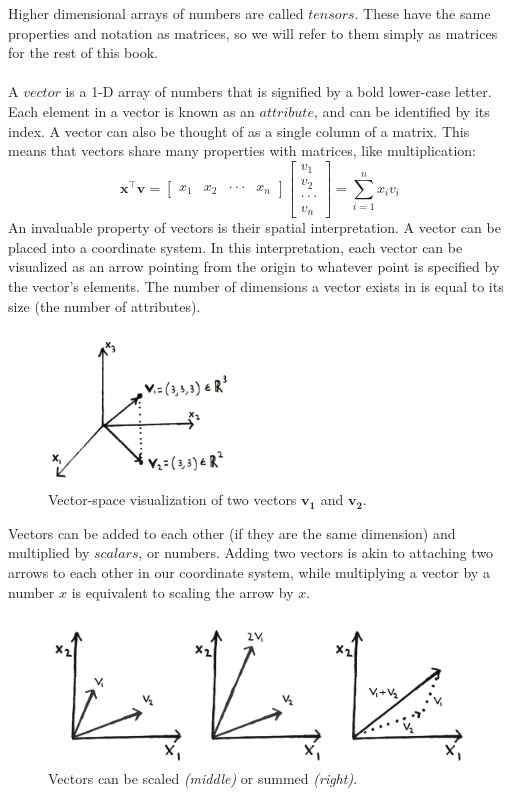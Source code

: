\documentclass[a4paper]{article}
\begin{document}
\noindent Higher dimensional arrays of numbers are called $tensors$. These have the same properties and notation as matrices, so we will refer to them simply as matrices for the rest of this book.
\\ \\
\noindent A $vector$ is a 1-D array of numbers that is signified by a bold lower-case letter. Each element in a vector is known as an $attribute$, and can be identified by its index. A vector can also be thought of as a single column of a matrix. This means that vectors share many properties with matrices, like multiplication:
\[ 
\bm{x}^{\intercal} \bm{v} = 
\begin{bmatrix}
x_1 & x_2 & \cdot \cdot \cdot & x_n
\end{bmatrix}
\begin{bmatrix}
v_1 \\ v_2 \\ \cdot \cdot \cdot \\ v_n
\end{bmatrix}
= 
\sum_{i = 1}^n x_i v_i
\]
An invaluable property of vectors is their spatial interpretation. A vector can be placed into a coordinate system. In this interpretation, each vector can be visualized as an arrow pointing from the origin to whatever point is specified by the vector's elements. The number of dimensions a vector exists in is equal to its size (the number of attributes).
\begin{figure}[H]
  \centering
  \includegraphics[width=2in]{figures/chap1/vectors}
  \caption{Vector-space visualization of two vectors $\bm{v_1}$ and $\bm{v_2}$.}
\end{figure}
\noindent Vectors can be added to each other (if they are the same dimension) and multiplied by $scalars$, or numbers. Adding two vectors is akin to attaching two arrows to each other in our coordinate system, while multiplying a vector by a number $x$ is equivalent to scaling the arrow by $x$.
\begin{figure}[H]
  \centering
  \includegraphics[width=5in]{figures/chap1/vector_ops}
  \caption{Vectors can be scaled {\it(middle)} or summed {\it(right)}.}
\end{figure}
\end{document}
